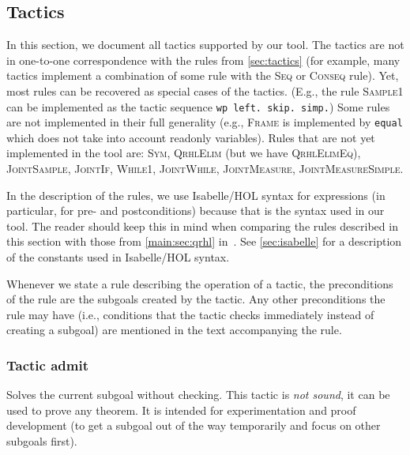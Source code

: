 \documentclass{article}
\newcommand\qrhlautoref[1]{\autoref*{main:#1} in~\cite{qrhl-paper-from-manual}}
\renewcommand\ruleref[1]{rule \hbox{\textsc{#1}}}
\renewcommand\rulerefx[1]{\hbox{\textsc{#1}}}
\begin{document}
\subsection{Tactics}
\label{sec:tactics}


In this section, we document all tactics supported by our 
tool. The tactics are not in one-to-one correspondence with the rules
from \autoref{sec:tactics} (for example, many tactics implement a
combination of some rule with the \rulerefx{Seq} or \rulerefx{Conseq}
rule). Yet, most rules can be recovered as special cases of the
tactics. (E.g., the \ruleref{Sample1} can be implemented as the tactic
sequence \texttt{wp left. skip. simp.}) Some rules are not
implemented in their full generality (e.g., \rulerefx{Frame} is
implemented by \texttt{equal} which does not take into account readonly
variables). Rules that are not yet implemented in the tool are:
\rulerefx{Sym}, \rulerefx{QrhlElim} (but we have
\rulerefx{QrhlElimEq}), \rulerefx{JointSample}, \rulerefx{JointIf},
\rulerefx{While1}, \rulerefx{JointWhile}, \rulerefx{JointMeasure},
\rulerefx{JointMeasureSimple}. 

In the description of the rules, we use Isabelle/HOL syntax for
expressions (in particular, for pre- and postconditions) because that
is the syntax used in our tool. The reader should keep this in mind
when comparing the rules described in this section with those from
\qrhlautoref{sec:qrhl}. See \autoref{sec:isabelle} for a description
of the constants used in Isabelle/HOL syntax.

Whenever we state a rule describing the operation of a tactic, the
preconditions of the rule are the subgoals created by the tactic. Any
other preconditions the rule may have (i.e., conditions that the tactic
checks immediately instead of creating a subgoal) are mentioned in the
text accompanying the rule.

\newcommand\tactic[1]{\subsubsection*{Tactic #1}\label{tactic:#1}\index{#1@\textttOLD{#1} (tactic)}}

\tactic{admit}

Solves the current subgoal without checking. This
tactic is \emph{not sound}, it can be used to prove any theorem.  It
is intended for experimentation and proof development (to get a
subgoal out of the way temporarily and focus on other subgoals first).
\end{document}
